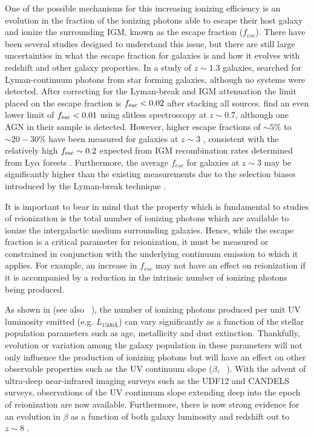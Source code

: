 One of the possible mechanisms for this increasing ionizing efficiency is an evolution in the fraction of the ionizing photons able to escape their host galaxy and ionize the surrounding IGM, known as the escape fraction ($f_{esc}$). There have been several studies designed to understand this issue, but there are still large uncertainties in what the escape fraction for galaxies is and how it evolves with redshift and other galaxy properties. In a study of $z \sim 1.3$ galaxies, \citet{Siana:2010bo} searched for Lyman-continuum photons from star forming galaxies, although no systems were detected.  After correcting for the Lyman-break and IGM attenuation the limit placed on the escape fraction is $f_{\rm esc} < 0.02$ after stacking all sources. \citet{Bridge:2010ie} find an even lower limit of $f_{\rm esc} < 0.01$ using slitless spectroscopy at $z \sim 0.7$, although one AGN in their sample is detected. However, higher escape fractions of $\sim5\%$ to $\sim20-30\%$ have been measured for galaxies at $z \sim 3$  \citep{Shapley:2006cq,Iwata:2009dy,Vanzella:2010jk,Nestor:2013kw}, consistent with the relatively high $f_{\rm esc} \sim 0.2$ expected from IGM recombination rates determined from Ly$\alpha$ forests \citep{Bolton:2007gc}. Furthermore, the average $f_{esc}$ for galaxies at $z\sim3$ may be significantly higher than the existing measurements due to the selection biases introduced by the Lyman-break technique \citep{Cooke:2014dd}. 

It is important to bear in mind that the property which is fundamental to studies of reionization is the total number of ionizing photons which are available to ionize the intergalactic medium surrounding galaxies. Hence, while the escape fraction is a critical parameter for reionization, it must be measured or constrained in conjunction with the underlying continuum emission to which it applies. For example, an increase in $f_{esc}$ may not have an effect on reionization if it is accompanied by a reduction in the intrinsic number of ionizing photons being produced.

As shown in \citet{Robertson:2013ji} (see also \citeauthor{Leitherer:1999jt}~\citeyear{Leitherer:1999jt}), the number of ionizing photons produced per unit UV luminosity emitted (e.g. $L_{1500\text{\AA}}$) can vary significantly as a function of the stellar population parameters such as age, metallicity and dust extinction. Thankfully, evolution or variation among the galaxy population in these parameters will not only influence the production of ionizing photons but will have an effect on other observable properties such as the UV continuum slope ($\beta$, \citeauthor{1994ApJ...429..582C}~\citeyear{1994ApJ...429..582C}).
With the advent of ultra-deep near-infrared imaging surveys such as the UDF12 \citep{Koekemoer:2013db} and CANDELS \citep{2011ApJS..197...35G,Koekemoer:2011br} surveys, observations of the UV continuum slope extending deep into the epoch of reionization are now available. Furthermore, there is now strong evidence for an evolution in $\beta$ as a function of both galaxy luminosity and redshift out to $z\sim 8$ \citep{Bouwens:2013vf,Rogers:2014bn}.

